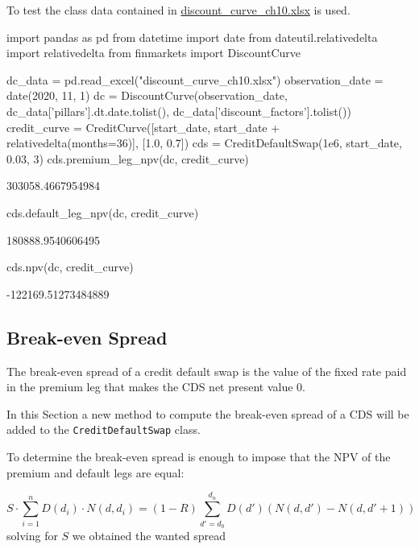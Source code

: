 To test the class data contained in \href{https://drive.google.com/file/d/1mugHyet3H9tcSAvYvt8G4_kpfaEbVY7b/view?usp=sharing}{discount\_curve\_ch10.xlsx} is used.

\begin{ipython}
import pandas as pd
from datetime import date
from dateutil.relativedelta import relativedelta
from finmarkets import DiscountCurve

dc_data = pd.read_excel("discount_curve_ch10.xlsx")
observation_date = date(2020, 11, 1)
dc = DiscountCurve(observation_date,
dc_data['pillars'].dt.date.tolist(),
dc_data['discount_factors'].tolist())
credit_curve = CreditCurve([start_date,
                   start_date + relativedelta(months=36)],
                   [1.0, 0.7])
cds = CreditDefaultSwap(1e6, start_date, 0.03, 3)
cds.premium_leg_npv(dc, credit_curve)
\end{ipython}
\begin{ioutput}
303058.4667954984
\end{ioutput}

\begin{ipython}
cds.default_leg_npv(dc, credit_curve)
\end{ipython}
\begin{ioutput}
180888.9540606495
\end{ioutput}

\begin{ipython}
cds.npv(dc, credit_curve)
\end{ipython}
\begin{ioutput}
-122169.51273484889
\end{ioutput}
	
\subsection{Break-even Spread}
The break-even spread of a credit default swap is the value of the fixed rate paid in the premium leg that makes the CDS net present value 0.

In this Section a new method to compute the break-even spread of a CDS will be added to the \texttt{CreditDefaultSwap} class.

To determine the break-even spread is enough to impose that the NPV of the premium and default legs are equal:

\begin{equation}
S \cdot\sum_{i=1}^{n} D(d_i) \cdot N(d, d_i)
= (1-R) \sum_{d'=d_0}^{d_n} D(d') \left( N(d, d') - N(d, d'+1) \right)
\end{equation}
solving for $S$ we obtained the wanted spread

